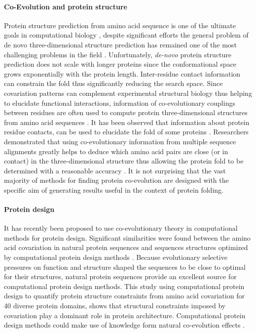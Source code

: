 \paragraph{Co-Evolution and protein structure}
Protein structure prediction from amino acid sequence is one of the ultimate goals in computational biology \cite{burger2010disentangling}, despite significant efforts the general problem of de novo three-dimensional structure prediction has remained one of the most challenging problems in the field \cite{marks2012protein}.
Unfortunately, \textit{de-novo} protein structure prediction does not scale with longer proteins since the conformational space grows exponentially with the protein length.
Inter-residue contact information can constrain the fold thus significantly reducing the search space.
Since covariation patterns can complement experimental structural biology thus helping to elucidate functional interactions, information of co-evolutionary couplings between residues are often used to compute protein three-dimensional structures from amino acid sequences \cite{marks2012protein}.
It has been observed that information about protein residue contacts, can be used to elucidate the fold of some proteins \cite{jones2012psicov}.
Researchers demonstrated that using co-evolutionary information from multiple sequence alignments greatly helps to deduce which amino acid pairs are close (or in contact) in the three-dimensional structure thus allowing the protein fold to be determined with a reasonable accuracy \cite{marks2012protein}.
It is not surprising that the vast majority of methods for finding protein co-evolution are designed with the specific aim of generating results useful in the context of protein folding.

\paragraph{Protein design}
It has recently been proposed to use co-evolutionary theory in computational methods for protein design.
Significant similarities were found between the amino acid covariation in natural protein sequences and sequences structures optimized by computational protein design methods \cite{ollikainen2013computational}.
Because evolutionary selective pressures on function and structure shaped the sequences to be close to optimal for their structures, natural protein sequences provide an excellent source for computational protein design methods.
This study using computational protein design to quantify protein structure constraints from amino acid covariation for 40 diverse protein domains, shows that structural constraints imposed by covariation play a dominant role in protein architecture.
Computational protein design methods could make use of knowledge form natural co-evolution effects \cite{ollikainen2013computational}.

